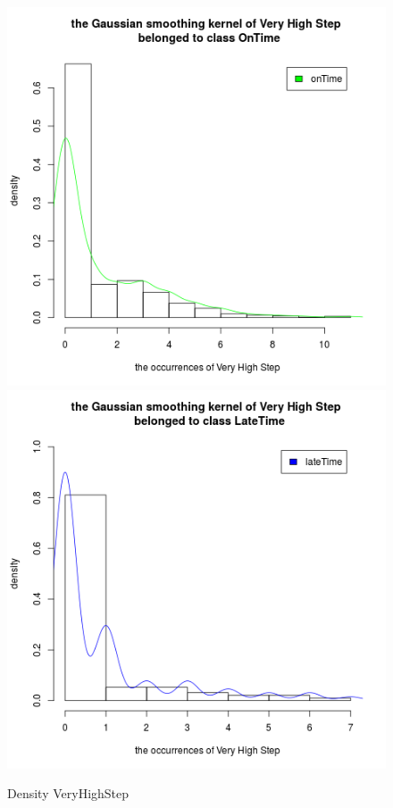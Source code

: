 \documentclass[a4paper, 13pt]{report}
\begin{document}
\begin{figure}[!htb]
  \includegraphics[width=\linewidth]{DensityVeryHighStep_OnTime}
\endminipage
{}
  \includegraphics[width=\linewidth]{DensityVeryHighStep_LateTime}
\endminipage
\caption*{Density VeryHighStep}
\end{figure}
\end{document}
